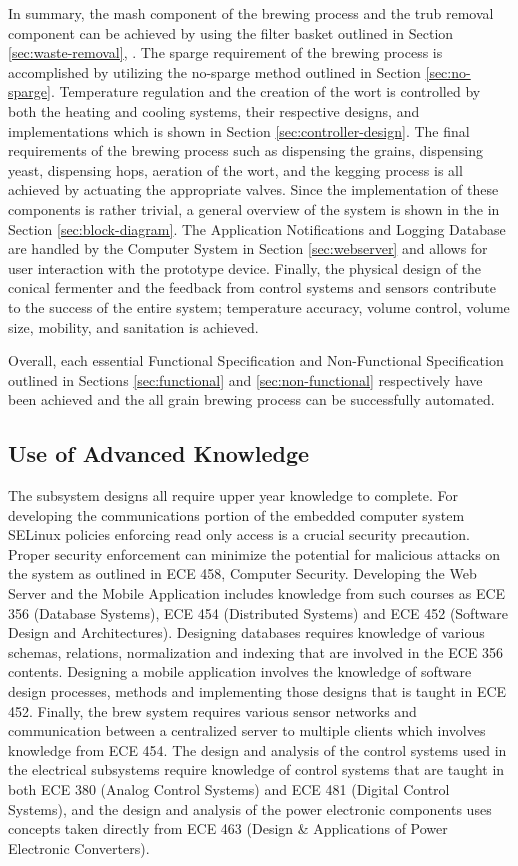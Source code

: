 \documentclass{article}
\begin{document}
In summary, the \gls{mash} component of the brewing process and the \gls{trub} removal component can be achieved by using the filter basket outlined in Section \ref{sec:waste-removal}, .  The \gls{sparge} requirement of the brewing process is accomplished by utilizing the no-sparge method outlined in Section \ref{sec:no-sparge}.  Temperature regulation and the creation of the \gls{wort} is controlled by both the heating and cooling systems, their respective designs, and implementations which is shown in Section \ref{sec:controller-design}.  The final requirements of the brewing process such as dispensing the grains, dispensing yeast, dispensing hops, aeration of the \gls{wort}, and the kegging process is all achieved by actuating the appropriate valves.  Since the implementation of these components is rather trivial, a general overview of the system is shown in the  in Section \ref{sec:block-diagram}.  The Application Notifications and Logging Database are handled by the Computer System in Section \ref{sec:webserver} and allows for user interaction with the prototype device.  Finally, the physical design of the conical fermenter and the feedback from control systems and sensors contribute to the success of the entire system; temperature accuracy, volume control, volume size, mobility, and sanitation is achieved.

Overall, each essential Functional Specification and Non-Functional Specification outlined in Sections \ref{sec:functional} and \ref{sec:non-functional} respectively have been achieved and the all grain brewing process can be successfully automated.
\subsection{Use of Advanced Knowledge}
The subsystem designs all require upper year knowledge to complete. For developing the communications portion of the embedded computer system SELinux policies enforcing read only access is a crucial security precaution.  Proper security enforcement can minimize the potential for malicious attacks on the system as outlined in ECE 458, Computer Security.  Developing the Web Server and the Mobile Application includes knowledge from such courses as ECE 356 (Database Systems), ECE 454 (Distributed Systems) and ECE 452 (Software Design and Architectures). Designing databases requires knowledge of various schemas, relations, normalization and indexing that are involved in the ECE 356 contents. Designing a mobile application involves the knowledge of software design processes, methods and implementing those designs that is taught in ECE 452. Finally, the brew system requires various sensor networks and communication between a centralized server to multiple clients which involves knowledge from ECE 454. The design and analysis of the control systems used in the electrical subsystems require knowledge of control systems that are taught in both ECE 380 (Analog Control Systems) and ECE 481 (Digital Control Systems), and the design and analysis of the power electronic components uses concepts taken directly from ECE 463 (Design \& Applications of Power Electronic Converters).
\end{document}
